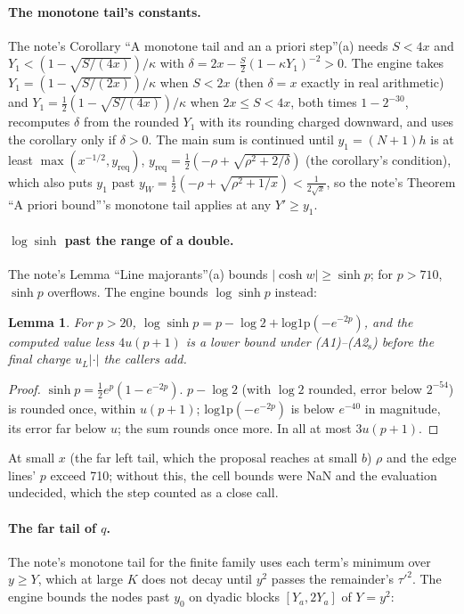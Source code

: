 \documentclass[11pt]{article}
\newtheorem{lemma}[theorem]{Lemma}
\theoremstyle{definition}
\newcommand{\lop}{\mathrm{log1p}}
\begin{document}
\paragraph{The monotone tail's constants.} The note's Corollary ``A monotone tail and an a priori step''(a) needs
$S<4x$ and $Y_1<(1-\sqrt{S/(4x)})/\kappa$ with $\delta=2x-\frac S2(1-\kappa Y_1)^{-2}>0$. The engine takes
$Y_1=(1-\sqrt{S/(2x)})/\kappa$ when $S<2x$ (then $\delta=x$ exactly in real arithmetic) and
$Y_1=\frac12(1-\sqrt{S/(4x)})/\kappa$ when $2x\le S<4x$, both times $1-2^{-30}$, recomputes $\delta$ from the rounded
$Y_1$ with its rounding charged downward, and uses the corollary only if $\delta>0$. The main sum is continued until
$y_1=(N+1)h$ is at least $\max(x^{-1/2},y_{\mathrm{req}})$, $y_{\mathrm{req}}=\frac12(-\rho+\sqrt{\rho^2+2/\delta})$
(the corollary's condition), which also puts $y_1$ past $y_W=\frac12(-\rho+\sqrt{\rho^2+1/x})<\frac1{2\sqrt x}$, so
the note's Theorem ``A priori bound'''s monotone tail applies at any $Y'\ge y_1$.

\paragraph{$\log\sinh$ past the range of a double.} The note's Lemma ``Line majorants''(a) bounds $|\cosh w|\ge
\sinh p$; for $p>710$, $\sinh p$ overflows. The engine bounds $\log\sinh p$ instead:

\begin{lemma}\label{lem:logsinh}
For $p>20$, $\log\sinh p=p-\log2+\lop(-e^{-2p})$, and the computed value less $4u(p+1)$ is a lower bound under
(A1)--(A2$_{\mathrm s}$) before the final charge $u_L|\cdot|$ the callers add.
\end{lemma}
\begin{proof}
$\sinh p=\frac12e^p(1-e^{-2p})$. $p-\log2$ (with $\log2$ rounded, error below $2^{-54}$) is rounded once, within
$u(p+1)$; $\lop(-e^{-2p})$ is below $e^{-40}$ in magnitude, its error far below $u$; the sum rounds once more. In all
at most $3u(p+1)$.
\end{proof}
At small $x$ (the far left tail, which the proposal reaches at small $b$) $\rho$ and the edge lines' $p$ exceed 710;
without this, the cell bounds were NaN and the evaluation undecided, which the step counted as a close call.

\paragraph{The far tail of $q$.} The note's monotone tail for the finite family uses each term's minimum over $y\ge
Y$, which at large $K$ does not decay until $y^2$ passes the remainder's $\tau'^2$. The engine bounds the nodes past
$y_0$ on dyadic blocks $[Y_a,2Y_a]$ of $Y=y^2$:
\end{document}
